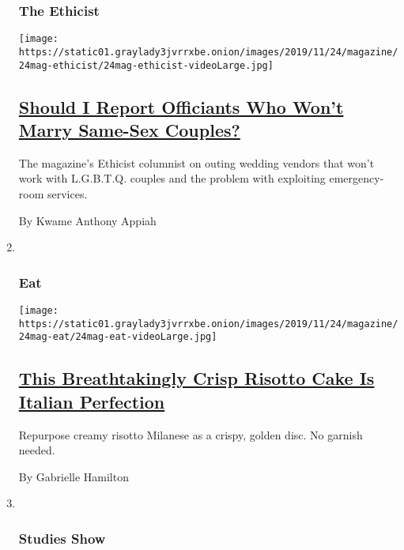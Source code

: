 \begin{enumerate}
{  \subsubsection{The Ethicist}\label{the-ethicist}}

  \texttt{[image: https://static01.graylady3jvrrxbe.onion/images/2019/11/24/magazine/24mag-ethicist/24mag-ethicist-videoLarge.jpg]}

  \hypertarget{should-i-report-officiants-who-wont-marry-same-sex-couples}{%
  \subsection{\texorpdfstring{\href{/2019/11/19/magazine/should-i-report-officiants-who-wont-marry-same-sex-couples.html}{Should
  I Report Officiants Who Won't Marry Same-Sex
  Couples?}}{Should I Report Officiants Who Won't Marry Same-Sex Couples?}}\label{should-i-report-officiants-who-wont-marry-same-sex-couples}}

  The magazine's Ethicist columnist on outing wedding vendors that won't
  work with L.G.B.T.Q. couples and the problem with exploiting
  emergency-room services.

  By Kwame Anthony Appiah
\item ~
  \hypertarget{eat}{%
  \subsubsection{Eat}\label{eat}}

  \texttt{[image: https://static01.graylady3jvrrxbe.onion/images/2019/11/24/magazine/24mag-eat/24mag-eat-videoLarge.jpg]}

  \hypertarget{this-breathtakingly-crisp-risotto-cake-is-italian-perfection}{%
  \subsection{\texorpdfstring{\href{/2019/11/19/magazine/risotto-cake-recipe.html}{This
  Breathtakingly Crisp Risotto Cake Is Italian
  Perfection}}{This Breathtakingly Crisp Risotto Cake Is Italian Perfection}}\label{this-breathtakingly-crisp-risotto-cake-is-italian-perfection}}

  Repurpose creamy risotto Milanese as a crispy, golden disc. No garnish
  needed.

  By Gabrielle Hamilton
\item ~
  \hypertarget{studies-show}{%
  \subsubsection{Studies Show}\label{studies-show}}


\end{enumerate}
